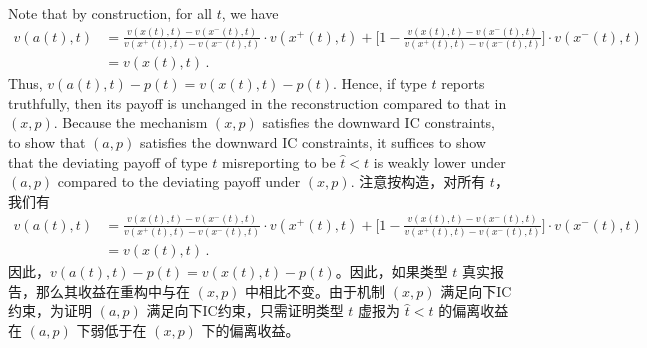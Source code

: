 \documentclass[12pt,letterpaper]{article}
\newenvironment{original}{\color{black}\noindent}{}
\newenvironment{translation}{\color{blue}\noindent}{}
\theoremstyle{plain}
\theoremstyle{definition}
\theoremstyle{remark}
\renewcommand{\1}{\mathds{1}}
\theoremstyle{definition}
\begin{document}
\begin{original}
Note that by construction, for all $t$, we have
\begin{align*}
v(a(t), t) &= \frac{v(x(t), t) - v(x^{-}(t), t)}{ v(x^{+}(t), t) -  v(x^{-}(t), t)} \cdot  v(x^{+}(t), t) + \Big[1 - \frac{v(x(t), t) - v(x^{-}(t), t)}{ v(x^{+}(t), t) -  v(x^{-}(t), t)}\Big] \cdot v(x^{-}(t), t)    \\
&=v(x(t), t)\,.
\end{align*}
Thus, $v(a(t), t) - p(t) = v(x(t), t) - p(t)$. Hence, if type $t$ reports truthfully, then its payoff is unchanged in the reconstruction compared to that in $(x, p)$. Because the mechanism $(x, p)$ satisfies the downward IC constraints, to show that $(a, p)$ satisfies the downward IC constraints, it suffices to show that the deviating payoff of type $t$ misreporting to be $\hat{t} < t$ is weakly lower under $(a, p)$ compared to the deviating payoff under $(x, p)$.
\end{original}
\begin{translation}
注意按构造，对所有 $t$，我们有
\begin{align*}
v(a(t), t) &= \frac{v(x(t), t) - v(x^{-}(t), t)}{ v(x^{+}(t), t) -  v(x^{-}(t), t)} \cdot  v(x^{+}(t), t) + \Big[1 - \frac{v(x(t), t) - v(x^{-}(t), t)}{ v(x^{+}(t), t) -  v(x^{-}(t), t)}\Big] \cdot v(x^{-}(t), t)    \\
&=v(x(t), t)\,.
\end{align*}
因此，$v(a(t), t) - p(t) = v(x(t), t) - p(t)$。因此，如果类型 $t$ 真实报告，那么其收益在重构中与在 $(x, p)$ 中相比不变。由于机制 $(x, p)$ 满足向下IC约束，为证明 $(a, p)$ 满足向下IC约束，只需证明类型 $t$ 虚报为 $\hat{t} < t$ 的偏离收益在 $(a, p)$ 下弱低于在 $(x, p)$ 下的偏离收益。
\end{translation}
\end{document}
